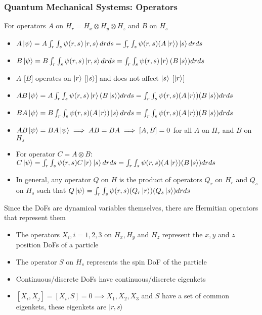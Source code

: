 \documentclass[8pt,t,mathserif,aspectratio=169]{beamer}
\begin{document}
\begin{frame}
  \frametitle{Quantum Mechanical Systems: Operators}
  \vspace{1mm}
  For operators $A$ on $H_r = H_x \otimes H_y \otimes H_z$ and $B$ on $H_s$
  \begin{itemize}
    \item $A \ket{\psi} = A \int_r \int_s \psi(r,s) \ket{r,s} dr ds = \int_r \int_s \psi(r,s) (A \ket{r}) \ket{s} dr ds$
    \item $B \ket{\psi} = B \int_r \int_s \psi(r,s) \ket{r,s} dr ds = \int_r \int_s \psi(r,s) \ket{r} (B \ket{s}) dr ds$
    \item $A$ [$B$] operates on $\ket{r}$ [$\ket{s}$] and does not affect $\ket{s}$ [$\ket{r}$]
    \item $AB \ket{\psi} = A \int_r \int_s \psi(r,s) \ket{r} (B \ket{s}) dr ds = \int_r \int_s \psi(r,s) (A \ket{r}) (B \ket{s}) dr ds$
    \item $BA \ket{\psi} = B \int_r \int_s \psi(r,s) (A \ket{r}) \ket{s} dr ds = \int_r \int_s \psi(r,s) (A \ket{r}) (B \ket{s}) dr ds$
    \item $AB \ket{\psi} = BA \ket{\psi} \implies AB = BA \implies [A,B] = 0$ for all $A$ on $H_r$ and $B$ on $H_s$
    \item For operator $C = A \otimes B$: $C \ket{\psi} = \int_r \int_s \psi(r,s) C \ket{r} \ket{s} dr ds = \int_r \int_s \psi(r,s) (A \ket{r}) (B \ket{s}) dr ds$
    \item In general, any operator $Q$ on $H$ is the product of operators $Q_r$ on $H_r$ and $Q_s$ on $H_s$ such that $Q \ket{\psi} = \int_r \int_s \psi(r,s) (Q_r \ket{r}) (Q_s \ket{s}) dr ds$
  \end{itemize}
  Since the DoFs are dynamical variables themselves, there are Hermitian operators that represent them
  \begin{itemize}
    \item The operators $X_i, i = 1,2,3$ on $H_x,H_y$ and $H_z$ represent the $x,y$ and $z$ position DoFs of a particle
    \item The operator $S$ on $H_s$ represents the spin DoF of the particle
    \item Continuous/discrete DoFs have continuous/discrete eigenkets
    \item $[X_i,X_j] = [X_i,S] = 0 \implies X_1,X_2,X_3$ and $S$ have a set of common eigenkets, these eigenkets are $\ket{r,s}$
  \end{itemize}
\end{frame}
\end{document}

